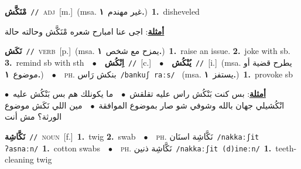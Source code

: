 \documentclass[10pt,a4paper,twoside]{article} %
\begin{document}
\begin{multicols}{2}
{\setlength\topsep{0pt}\textbf{\foreignlanguage{arabic}{مْنَكَّش}}\ {\color{gray}\texttt{//}\color{black}}\ \textsc{adj}\ [m.]\ \color{gray}(msa. \foreignlanguage{arabic}{غير مهندم}~\foreignlanguage{arabic}{\textbf{١.}})\color{black}\ \textbf{1.}~disheveled\  \begin{flushright}\color{gray}\foreignlanguage{arabic}{\textbf{\underline{\foreignlanguage{arabic}{أمثلة}}}: اجى عنا امبارح شعره مْنَكَّش وحالته حالة}\end{flushright}\color{black}} \vspace{2mm}

{\setlength\topsep{0pt}\textbf{\foreignlanguage{arabic}{نَكَش}}\ {\color{gray}\texttt{//}\color{black}}\ \textsc{verb}\ [p.]\ \color{gray}(msa. \foreignlanguage{arabic}{يمزح مع شخص}~\foreignlanguage{arabic}{\textbf{١.}})\color{black}\ \textbf{1.}~raise an issue.  \textbf{2.}~joke with sb.  \textbf{3.}~remind sb with sth\ \ $\bullet$\ \ \setlength\topsep{0pt}\textbf{\foreignlanguage{arabic}{اِنْكُش}}\ {\color{gray}\texttt{//}\color{black}}\ [c.]\ \ $\bullet$\ \ \setlength\topsep{0pt}\textbf{\foreignlanguage{arabic}{يُنْكُش}}\ {\color{gray}\texttt{//}\color{black}}\ [i.]\ \color{gray}(msa. \foreignlanguage{arabic}{يطرح قضية أو موضوع}~\foreignlanguage{arabic}{\textbf{١.}})\color{black}\ \ $\bullet$\ \ \textsc{ph.} \color{gray} \foreignlanguage{arabic}{بنكش رَاس}\color{black}\ {\color{gray}\texttt{/{\sffamily bankuʃ raːs}/}\color{black}}\ \color{gray} (msa. \foreignlanguage{arabic}{يستفز}~\foreignlanguage{arabic}{\textbf{١.}})\color{black}\ \textbf{1.}~provoke sb\  \begin{flushright}\color{gray}\foreignlanguage{arabic}{\textbf{\underline{\foreignlanguage{arabic}{أمثلة}}}: بس كنت بَنْكُش راس عليه تقلقش\ $\bullet$\ \  ما يكونلك هم بس بَنْكُش عليه\ $\bullet$\ \  انْكُشيلي جهان بالله وشوفي شو صار بموضوع الموافقة\ $\bullet$\ \  مين اللي نَكَش موضوع الورثة؟ مش أنت}\end{flushright}\color{black}} \vspace{2mm}

{\setlength\topsep{0pt}\textbf{\foreignlanguage{arabic}{نَكَّاشِة}}\ {\color{gray}\texttt{//}\color{black}}\ \textsc{noun}\ [f.]\ \textbf{1.}~twig  \textbf{2.}~swab\ \ $\bullet$\ \ \textsc{ph.} \color{gray} \foreignlanguage{arabic}{نَكَّاشِة اسنَان}\color{black}\ {\color{gray}\texttt{/{\sffamily nakkaːʃit ʔasnaːn}/}\color{black}}\ \textbf{1.}~cotton swabs\ \ $\bullet$\ \ \textsc{ph.} \color{gray} \foreignlanguage{arabic}{نَكَّاشِة ذنين}\color{black}\ {\color{gray}\texttt{/{\sffamily nakkaːʃit (d)ineːn}/}\color{black}}\ \textbf{1.}~teeth-cleaning twig\ } \vspace{2mm}


\end{multicols}
\end{document}
